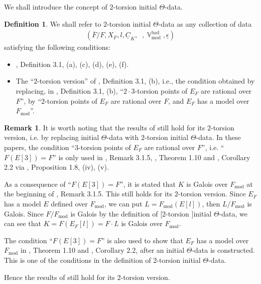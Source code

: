\documentclass[a4paper, 12pt]{article}
\DeclareMathOperator{\uV}{\underline{\V}}
\DeclareMathOperator{\V}{\mathbb{V}}
\DeclareMathOperator{\bad}{\text{bad}}
\DeclareMathOperator{\tmod}{\text{mod}}
\numberwithin{equation}{section}
\theoremstyle{definition}
\newtheorem{definition}[thm]{Definition}
\newtheorem{tiny-remark}{Remark}[thm]
\begin{document}
We shall introduce the concept of $2$-torsion initial $\Theta$-data.

\begin{definition} \label{1-def: mu_2-initial Theta-Data}
We shall refer to $2$-torsion initial $\Theta$-data as any collection of data
\begin{align*}
(\overline{F}/F,X_F,l,\underline{C}_K, \uV,\V_{\tmod}^{\bad}, \underline{\epsilon})
\end{align*}
satisfying the following conditions:
\begin{itemize}
\item \cite{IUTchI}, Definition 3.1, (a), (c), (d), (e), (f).
\item The ``$2$-torsion version'' of \cite{IUTchI}, Definition 3.1, (b), i.e., the condition obtained by replacing, in \cite{IUTchI}, Definition 3.1, (b), ``$2 \cdot 3$-torsion points of $E_F$ are rational over $F$'', by
``2-torsion points of $E_F$ are rational over $F$, and $E_F$ has a model over $F_{\tmod}$''.
\end{itemize}
\end{definition}

\begin{tiny-remark} \label{1-1-rmk1}
It is worth noting that the results of \cite{IUTchI,IUTchII,IUTchIII,IUTchIV} still hold for its $2$-torsion version, i.e. by replacing initial $\Theta$-data with $2$-torsion initial $\Theta$-data. 
In these papers, the condition ``$3$-torsion points of $E_F$ are rational over $F$'', i.e. ``$F(E[3])=F$'' is only used in \cite{IUTchI}, Remark 3.1.5, \cite{IUTchIV}, Theorem 1.10 and \cite{IUTchIV}, Corollary 2.2 via \cite{IUTchIV}, Proposition 1.8, (iv), (v).

As a consequence of ``$F(E[3])=F$'', it is stated that $K$ is Galois over $F_{\tmod}$ at the beginning of \cite{IUTchI}, Remark 3.1.5.
This still holds for its $2$-torsion version. 
Since $E_F$ has a model $E$ defined over $F_{\tmod}$, we can put $L = F_{\tmod}(E[l])$, then $L/F_{\tmod}$ is Galois. Since $F/F_{\tmod}$ is Galois by the definition of [$2$-torsion ]initial $\Theta$-data, we can see that $K = F(E_F[l]) = F\cdot L$ is Galois over $F_{\tmod}$.

The condition ``$F(E[3])=F$'' is also used to show that $E_F$ has a model over $F_{\tmod}$ in \cite{IUTchIV}, Theorem 1.10 and \cite{IUTchIV}, Corollary 2.2, after an initial $\Theta$-data is constructed. 
This is one of the conditions in the definition of $2$-torsion initial $\Theta$-data.

Hence the results of \cite{IUTchI,IUTchII,IUTchIII,IUTchIV} still hold for its $2$-torsion version.
\end{tiny-remark}
\end{document}
